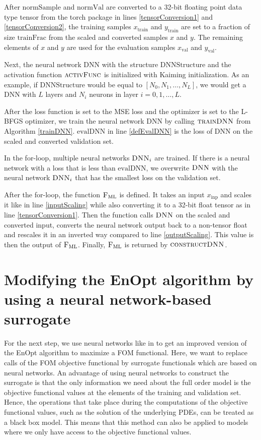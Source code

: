 After $\mathrm{normSample}$ and $\mathrm{normVal}$ are converted to a 32-bit floating point data type tensor from the torch package in lines \ref{tensorConversion1} and \ref{tensorConversion2}, the training samples $x_\mathrm{train}$ and $y_\mathrm{train}$ are set to a fraction of size $\mathrm{trainFrac}$ from the scaled and converted samples $x$ and $y$. The remaining elements of $x$ and $y$ are used for the evaluation samples $x_\mathrm{val}$ and $y_\mathrm{val}$.

Next, the neural network $\mathrm{DNN}$ with the structure $\mathrm{DNNStructure}$ and the activation function $\textproc{activFunc}$ is initialized with Kaiming initialization. As an example, if $\mathrm{DNNStructure}$ would be equal to $[N_0, N_1, \dotsc, N_L]$, we would get a DNN with $L$ layers and $N_i$ neurons in layer $i=0, 1, \dotsc, L$.

After the loss function is set to the MSE loss and the optimizer is set to the L-BFGS optimizer, we train the neural network $\mathrm{DNN}$ by calling $\textproc{trainDNN}$ from Algorithm \ref{trainDNN}. $\mathrm{evalDNN}$ in line \ref{defEvalDNN} is the loss of $\mathrm{DNN}$ on the scaled and converted validation set.

In the for-loop, multiple neural networks $\textproc{DNN}_i$ are trained. If there is a neural network with a loss that is less than $\mathrm{evalDNN}$, we overwrite $\textproc{DNN}$ with the neural network $\textproc{DNN}_i$ that has the smallest loss on the validation set.

After the for-loop, the function $\textproc{F$_\mathrm{ML}$}$ is defined. It takes an input $x_\mathrm{inp}$ and scales it like in line \ref{inputScaling} while also converting it to a 32-bit float tensor as in line \ref{tensorConversion1}. Then the function calls $\textproc{DNN}$ on the scaled and converted input, converts the neural network output back to a non-tensor float and rescales it in an inverted way compared to line \ref{outputScaling}. This value is then the output of $\textproc{F$_\mathrm{ML}$}$. Finally, $\textproc{F$_\mathrm{ML}$}$ is returned by $\textproc{constructDNN}$.

\section{Modifying the EnOpt algorithm by using a neural network-based surrogate}

For the next step, we use neural networks like in \cite{Keil2022-dj} to get an improved version of the EnOpt algorithm to maximize a FOM functional. Here, we want to replace calls of the FOM objective functional by surrogate functionals which are based on neural networks. An advantage of using neural networks to construct the surrogate is that the only information we need about the full order model is the objective functional values at the elements of the training and validation set. Hence, the operations that take place during the computations of the objective functional values, such as the solution of the underlying PDEs, can be treated as a black box model. This means that this method can also be applied to models where we only have access to the objective functional values.\\

